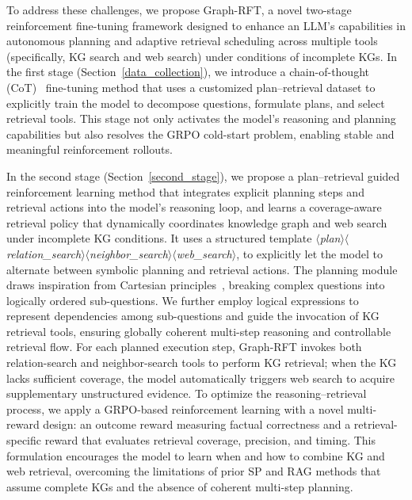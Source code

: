 \documentclass[sigconf]{acmart}
\begin{document}
\begin{sloppypar}
To address these challenges, we propose Graph-RFT, a novel two-stage reinforcement fine-tuning framework designed to enhance an LLM’s capabilities in autonomous planning and adaptive retrieval scheduling across multiple tools (specifically, KG search and web search) under conditions of incomplete KGs.
In the first stage (Section~\ref{data_collection}), we introduce a chain-of-thought (CoT)~\cite{wei2022chain} fine-tuning method that uses a customized plan–retrieval dataset to explicitly train the model to decompose questions, formulate plans, and select retrieval tools. This stage not only activates the model’s reasoning and planning capabilities but also resolves the GRPO \cite{guo2025deepseek} cold-start problem, enabling stable and meaningful reinforcement rollouts. 

In the second stage (Section~\ref{second_stage}), we propose a plan–retrieval guided reinforcement learning method that integrates explicit planning steps and retrieval actions into the model’s reasoning loop, and learns a coverage-aware retrieval policy that dynamically coordinates knowledge graph and web search under incomplete KG conditions.
It uses a structured template
$\langle$\textit{plan}$\rangle\langle$\textit{relation\_search}$\rangle\langle$\textit{neighbor\_search}$\rangle$$\langle$\textit{web\_search}$\rangle$, to explicitly let the model to alternate between symbolic planning and retrieval actions. 
The planning module draws inspiration from Cartesian principles~\cite{descartes1901discourse}, breaking complex questions into logically ordered sub-questions. We further employ logical expressions to represent dependencies among sub-questions and guide the invocation of KG retrieval tools, ensuring globally coherent multi-step reasoning and controllable retrieval flow. For each planned execution step, Graph-RFT invokes both relation-search and neighbor-search tools to perform KG retrieval; when the KG lacks sufficient coverage, the model automatically triggers web search to acquire supplementary unstructured evidence.
To optimize the reasoning–retrieval process, we apply a GRPO-based reinforcement learning with a novel multi-reward design: an outcome reward measuring factual correctness and a retrieval-specific reward that evaluates retrieval coverage, precision, and timing.
This formulation encourages the model to learn when and how to combine KG and web retrieval, overcoming the limitations of prior SP and RAG methods that assume complete KGs and the absence of coherent multi-step planning.
$$
\end{sloppypar}
\end{document}
